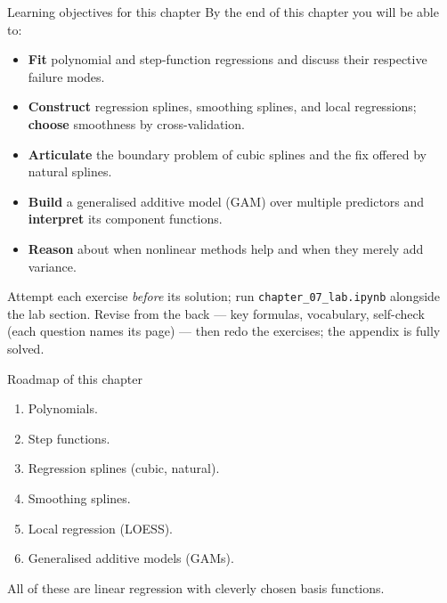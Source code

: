 \documentclass[aspectratio=169,11pt]{beamer}
\begin{document}
\begin{frame}{Learning objectives for this chapter}
  \small
  By the end of this chapter you will be able to:
  \begin{itemize}
    \item \textbf{Fit} polynomial and step-function regressions and
          discuss their respective failure modes.
    \item \textbf{Construct} regression splines, smoothing splines, and
          local regressions; \textbf{choose} smoothness by
          cross-validation.
    \item \textbf{Articulate} the boundary problem of cubic splines
          and the fix offered by natural splines.
    \item \textbf{Build} a generalised additive model (GAM) over
          multiple predictors and \textbf{interpret} its component
          functions.
    \item \textbf{Reason} about when nonlinear methods help and when
          they merely add variance.
  \end{itemize}
  \begin{readme}
    \footnotesize Attempt each exercise \emph{before} its solution; run
    \texttt{chapter\_07\_lab.ipynb} alongside the lab section. Revise from the
    back --- key formulas, vocabulary, self-check (each question names its
    page) --- then redo the exercises; the appendix is fully solved.
  \end{readme}
\end{frame}


\begin{frame}{Roadmap of this chapter}
  \begin{takeaway}
    \begin{enumerate}
      \item Polynomials.
      \item Step functions.
      \item Regression splines (cubic, natural).
      \item Smoothing splines.
      \item Local regression (LOESS).
      \item Generalised additive models (GAMs).
    \end{enumerate}
  \end{takeaway}
  All of these are linear regression with cleverly chosen basis
  functions.
\end{frame}
\end{document}
